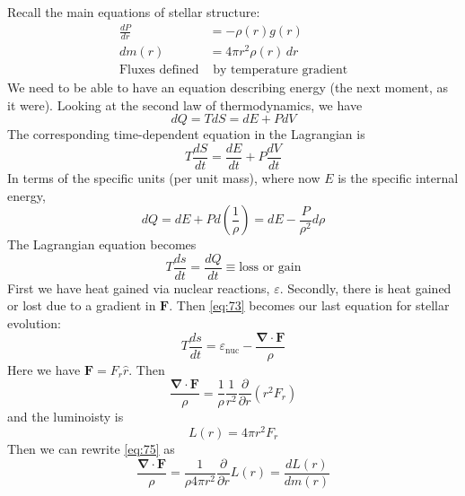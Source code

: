 \documentclass[10pt]{article}
\numberwithin{equation}{section}
\begin{document}
  Recall the main equations of stellar structure:
  \begin{align}
    \label{eq:69}
    \frac{dP}{dr}&=-\rho(r)g(r)\\
    dm(r)&=4\pi r^2\rho(r)\,dr\\
    \nonumber\textrm{Fluxes defined}&\textrm{ by temperature gradient}
  \end{align}
  We need to be able to have an equation describing energy (the next
  moment, as it were). Looking at the second law of thermodynamics, we
  have
  \begin{equation}
    \label{eq:70}
    dQ=TdS=dE+PdV
  \end{equation}
  The corresponding time-dependent equation in the Lagrangian is
  \begin{equation}
    \label{eq:71}
    T\frac{dS}{dt}=\frac{dE}{dt}+P\frac{dV}{dt}
  \end{equation}
  In terms of the specific units (per unit mass), where now $E$ is the
  specific internal energy,
  \begin{equation}
    \label{eq:72}
    dQ=dE+Pd\left(\frac{1}{\rho}\right)=dE-\frac{P}{\rho^2}d\rho
  \end{equation}
  The Lagrangian equation becomes
  \begin{equation}
    \label{eq:73}
    T\frac{ds}{dt}=\frac{dQ}{dt}\equiv\textrm{loss or gain}
  \end{equation}
  First we have heat gained via nuclear reactions,
  $\varepsilon$. Secondly, there is heat gained or lost due to a
  gradient in $\mathbf{F}$. Then \eqref{eq:73} becomes our last equation
  for stellar evolution:
  \begin{equation}
    \label{eq:74}
    \boxed{T\frac{ds}{dt}=\varepsilon_{\mathrm{nuc}}-\frac{\bm{\nabla}\cdot
\mathbf{F}}{\rho}}
  \end{equation}
  Here we have $\mathbf{F}=F_r\hat{r}$. Then
  \begin{equation}
    \label{eq:75}
    \frac{\bm{\nabla}\cdot\mathbf{F}}{\rho}=\frac{1}{\rho}\frac{1}
{r^2}\frac{\partial}{\partial
      r}\left(r^2F_r\right)
  \end{equation}
  and the luminoisty is
  \begin{equation}
    \label{eq:76}
    L(r)=4\pi r^2F_r
  \end{equation}
  Then we can rewrite \eqref{eq:75} as
  \begin{equation}
    \label{eq:77}
    \frac{\bm{\nabla}\cdot\mathbf{F}}{\rho}=\frac{1}{\rho4\pi
      r^2}\frac{\partial}{\partial r}L(r)=\frac{d L(r)}{dm(r)}
  \end{equation}
\end{document}
